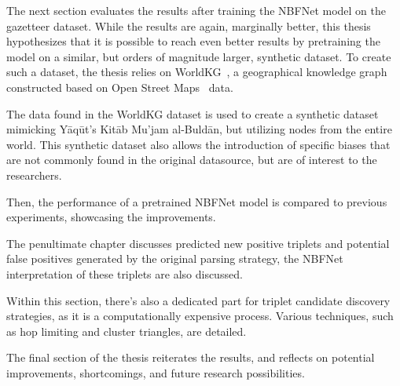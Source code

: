 The next section evaluates the results after training the NBFNet model on the gazetteer dataset.
While the results are again, marginally better, this thesis hypothesizes that it is possible to reach even better results
by pretraining the model on a similar, but orders of magnitude larger, synthetic dataset.
To create such a dataset, the thesis relies on WorldKG~\cite{WorldKG}, a geographical knowledge graph constructed based on Open Street
Maps~\cite{OpenStreetMap} data.

The data found in the WorldKG dataset is used to create a synthetic dataset mimicking Yāqūt's Kitāb Mu'jam al-Buldān,
but utilizing nodes from the entire world.
This synthetic dataset also allows the introduction of specific biases that are not commonly found in the original datasource,
but are of interest to the researchers.

Then, the performance of a pretrained NBFNet model is compared to previous experiments, showcasing the improvements.

The penultimate chapter discusses predicted new positive triplets and potential false positives generated by the original
parsing strategy, the NBFNet interpretation of these triplets are also discussed.

Within this section, there's also a dedicated part for triplet candidate discovery strategies,
as it is a computationally expensive process.
Various techniques, such as hop limiting and cluster triangles, are detailed.

The final section of the thesis reiterates the results, and reflects on potential improvements, shortcomings, and future
research possibilities.





